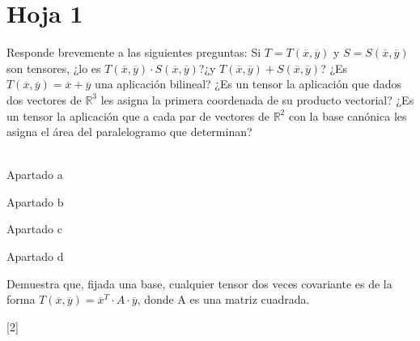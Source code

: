 \section{Hoja 1}


\begin{problem}[1]Responde brevemente a las siguientes preguntas:
	\ppart Si $T=T(\overline{x},\overline{y})$ y $S=S(\overline{x},\overline{y})$ son tensores, ¿lo es $T(\overline{x},\overline{y})\cdot S(\overline{x},\overline{y})$?¿y $T(\overline{x},\overline{y})+S(\overline{x},\overline{y})$?
	\ppart ¿Es $T(\overline{x},\overline{y})=\overline{x}+\overline{y}$ una aplicación bilineal?
	\ppart ¿Es un tensor la aplicación que dados dos vectores de $ℝ^{3}$ les asigna la primera coordenada de su producto vectorial?
	\ppart ¿Es un tensor la aplicación que a cada par de vectores de $ℝ^{2}$ con la base canónica les asigna el área del paralelogramo que determinan?
	
	\solution
	 \\
	\spart Apartado a
	
	\spart Apartado b
	
	\spart Apartado c
	
	\spart Apartado d
	

	
\end{problem}
\begin{problem}[2]
	Demuestra que, fijada una base, cualquier tensor dos veces covariante es de la forma $T(\overline{x},\overline{y})=\overline{x}^{T}\cdot A\cdot\overline{y}$, donde A es una matriz cuadrada.
\end{problem}[2]
